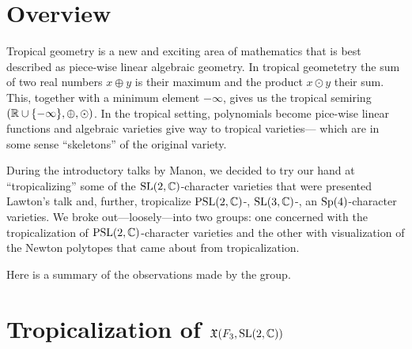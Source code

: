 \documentclass[11pt]{article}
\begin{document}
\renewcommand*{\thefootnote}{\fnsymbol{footnote}}


\author[1]{Shams Alyusof}
\author[4]{Corry Bedwell}
\author[2]{Ellie Dannenberg}
\author[5]{Dmitry Gekhtman}
\author[1]{Charlie Katerba}
\author[1]{Jack Love}
\author[1]{Chris Manon}
\author[3]{Giuseppe Martone}
\author[6]{\href{mailto:\eemail}{\auth}}%

\renewcommand\Authands{ and }
\title{\tight}%
\date{\today}%

\maketitle
\section{Overview}
Tropical geometry is a new and exciting area of mathematics that is best
described as piece-wise linear algebraic geometry. In tropical geometetry
the sum of two real numbers $x\oplus y$ is their maximum and the product
$x\odot y$ their sum. This, together with a minimum element $-\infty$,
gives us the tropical semiring $(\mathbb{R}\cup\{-\infty\},\oplus,\odot)$. In the
tropical setting, polynomials become pice-wise linear functions and
algebraic varieties give way to tropical varieties--- which are in some
sense ``skeletons'' of the original variety.

During the introductory talks by Manon, we decided to try our hand at
``tropicalizing'' some of the $\mathrm{SL}(2,\mathbb{C})$-character varieties that were
presented Lawton's talk and, further, tropicalize $\mathrm{PSL}(2,\mathbb{C})$-,
$\mathrm{SL}(3,\mathbb{C})$-, an $\mathrm{Sp}(4)$-character varieties. We broke
out---loosely---into two groups: one concerned with the tropicalization of
$\mathrm{PSL}(2,\mathbb{C})$-character varieties and the other with visualization of the
Newton polytopes that came about from tropicalization.

Here is a summary of the observations made by the group.

\section{Tropicalization of $\mathfrak{X}(F_3,\mathrm{SL}(2,\mathbb{C}))$}
\end{document}
